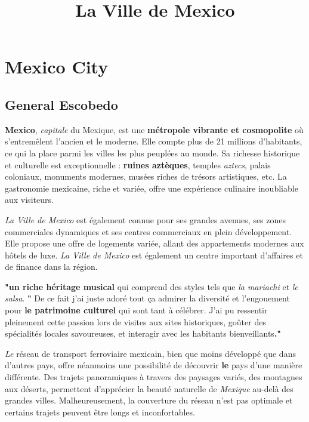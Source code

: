 \documentclass[12pt, a4paper]{article}
\title{La Ville de Mexico}
\author{}
\date{}
\begin{document}
   \maketitle

\section*{Mexico City}

\subsection{General Escobedo}

\textbf{Mexico}, \textit{capitale} du Mexique, est une \textbf{métropole vibrante et cosmopolite} où s'entremêlent l'ancien et le moderne. Elle compte plus de 21 millions d'habitants, ce qui la place parmi les villes les plus peuplées au monde. Sa richesse historique et culturelle est exceptionnelle : \textbf{ruines aztèques}, temples \textit{aztecs}, palais coloniaux, monuments modernes, musées riches de trésors artistiques, etc. La gastronomie mexicaine, riche et variée, offre une expérience culinaire inoubliable aux visiteurs.

\textit{La Ville de Mexico} est également connue pour ses grandes avenues, ses zones commerciales dynamiques et ses centres commerciaux en plein développement. Elle propose une offre de logements variée, allant des appartements modernes aux hôtels de luxe. \textit{La Ville de Mexico} est également un centre important d'affaires et de finance dans la région.


\textbf{"un riche héritage musical} qui comprend des styles tels que \textit{la mariachi} et \textit{le salsa}. \textbf{"}
De ce fait j'ai juste adoré tout ça admirer la diversité et l’engouement pour \textbf{le patrimoine culturel} qui sont tant à célébrer. J’ai pu ressentir pleinement cette passion lors de visites aux sites historiques, goûter des spécialités locales savoureuses, et interagir avec les habitants bienveillants\textbf{."}

\textit{Le} réseau de transport ferroviaire mexicain, bien que moins développé que dans d’autres pays, offre néanmoins une possibilité de découvrir \textbf{le} pays d’une manière différente.  Des trajets panoramiques à travers des paysages variés, des montagnes aux déserts, permettent d’apprécier la beauté naturelle de \textit{Mexique} au-delà des grandes villes.  Malheureusement, la couverture du réseau n’est pas optimale et certains trajets peuvent être longs et inconfortables.
\end{document}
